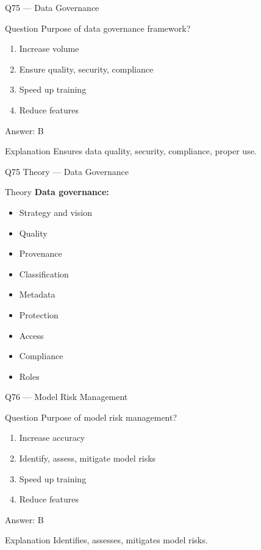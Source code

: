 \documentclass[aspectratio=169,8pt]{beamer}
\begin{document}
	\begin{frame}{Q75 --- Data Governance}
		\begin{block}{Question}
			Purpose of data governance framework?
		\end{block}
		\begin{enumerate}[label=\Alph*.]
			\item Increase volume
			\item Ensure quality, security, compliance
			\item Speed up training
			\item Reduce features
		\end{enumerate}
		\begin{exampleblock}{Answer: B}
		\end{exampleblock}
		\begin{block}{Explanation}
			Ensures data quality, security, compliance, proper use.
		\end{block}
	\end{frame}
	
	\begin{frame}{Q75 Theory --- Data Governance}
		\begin{block}{Theory}
			\textbf{Data governance:}
			\begin{itemize}
				\item Strategy and vision
				\item Quality
				\item Provenance
				\item Classification
				\item Metadata
				\item Protection
				\item Access
				\item Compliance
				\item Roles
			\end{itemize}
		\end{block}
	\end{frame}
	
	\begin{frame}{Q76 --- Model Risk Management}
		\begin{block}{Question}
			Purpose of model risk management?
		\end{block}
		\begin{enumerate}[label=\Alph*.]
			\item Increase accuracy
			\item Identify, assess, mitigate model risks
			\item Speed up training
			\item Reduce features
		\end{enumerate}
		\begin{exampleblock}{Answer: B}
		\end{exampleblock}
		\begin{block}{Explanation}
			Identifies, assesses, mitigates model risks.
		\end{block}
	\end{frame}
	
\end{document}
